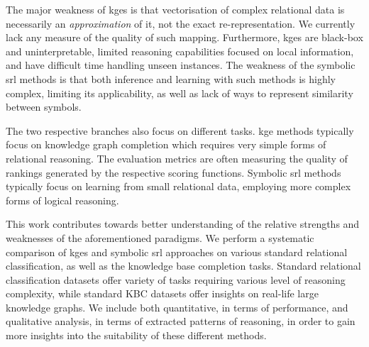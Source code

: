 The major weakness of \gls{kge}s is that vectorisation of complex relational data is necessarily an \textit{approximation} of it, not the exact re-representation.
We currently lack any measure of the quality of such mapping.
Furthermore, \gls{kge}s are black-box and uninterpretable, limited reasoning capabilities focused on local information, and have difficult time handling unseen instances.
The weakness of the symbolic \gls{srl} methods is that both inference and learning with such methods is highly complex, limiting its applicability, as well as lack of ways to represent similarity between symbols.



The two respective branches also focus on different tasks.
\gls{kge} methods typically focus on knowledge graph completion which requires very simple forms of relational reasoning. The evaluation metrics are often measuring the quality of rankings generated by the respective scoring functions.
Symbolic \gls{srl} methods typically focus on learning from small relational data, employing more complex forms of logical reasoning.







This work contributes towards better understanding of the relative strengths and weaknesses of the aforementioned paradigms.
We perform a systematic comparison of \gls{kge}s and symbolic \gls{srl} approaches on various standard relational classification, as well as the knowledge base completion tasks.
Standard relational classification datasets offer variety of tasks requiring various level of reasoning complexity, while standard KBC datasets offer insights on real-life large knowledge graphs.
We include both quantitative, in terms of performance, and qualitative analysis, in terms of extracted patterns of reasoning, in order to gain more insights into the suitability of these different methods.









